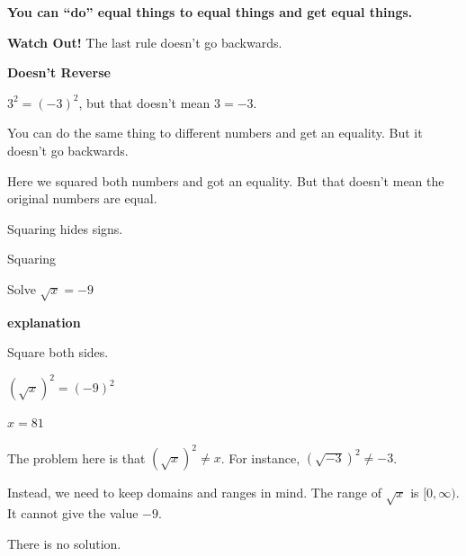 \documentclass{ximera}
\begin{document}
\begin{center}


\textbf{\textcolor{purple!85!blue}{You can ``do'' equal things to equal things and get equal things.}}


\end{center}



\textbf{\textcolor{red!70!black}{Watch Out!}} The last rule doesn't go backwards.




\begin{warning}  \textbf{\textcolor{red!70!black}{Doesn't Reverse}}  



$3^2 = (-3)^2$, but that doesn't mean $3=-3$.


You can do the same thing to different numbers and get an equality.  But it doesn't go backwards.  

Here we squared both numbers and got an equality.  But that doesn't mean the original numbers are equal.


\end{warning}



Squaring hides signs.


\begin{example} Squaring


Solve $\sqrt{x} = -9$

\textbf{\textcolor{red!75!green}{explanation}} 

Square both sides.


$(\sqrt{x})^2 = (-9)^2$

$x = 81$



The problem here is that  $(\sqrt{x})^2 \ne x$.  For instance, $(\sqrt{-3})^2 \ne -3$.


Instead, we need to keep domains and ranges in mind.  The range of $\sqrt{x}$ is $[0, \infty)$. It cannot give the value $-9$.


There is no solution.




\end{example}
\end{document}
